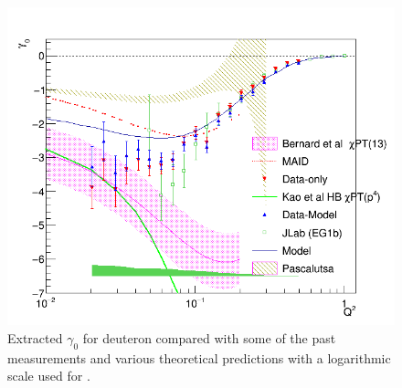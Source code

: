 \begin{figure}[H] %
  \centering
  \leavevmode \includegraphics[width=1.0\textwidth]{figuresEG4/FigResults/integralsFromCombinedG1nA1F1_Wbins70Gm0LogN} 
  \caption[$\gamma^d_0$ (log scale)]{Extracted $\gamma_0$ for deuteron compared with some of the past measurements and various theoretical predictions  with a logarithmic scale used for \qsq.}
  \label{Gamma0Log}  
\end{figure}

